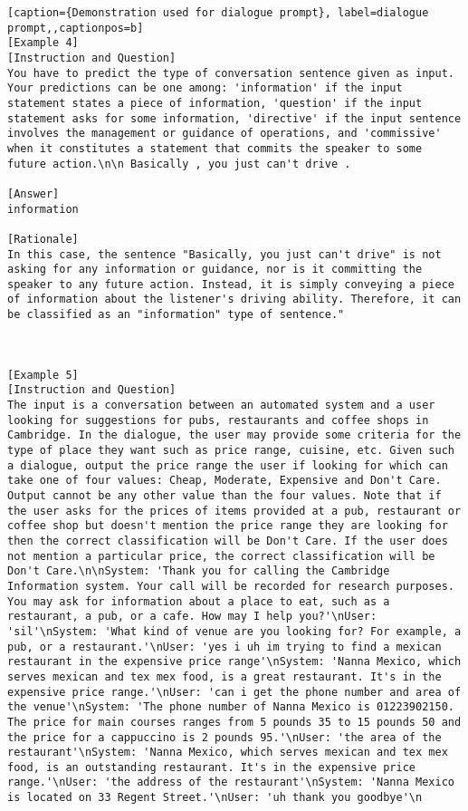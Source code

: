 \begin{lstlisting}[caption={Demonstration used for dialogue prompt}, label=dialogue prompt,,captionpos=b]
[Example 4]
[Instruction and Question]
You have to predict the type of conversation sentence given as input. Your predictions can be one among: 'information' if the input statement states a piece of information, 'question' if the input statement asks for some information, 'directive' if the input sentence involves the management or guidance of operations, and 'commissive' when it constitutes a statement that commits the speaker to some future action.\n\n Basically , you just can't drive . 

[Answer]
information

[Rationale]
In this case, the sentence "Basically, you just can't drive" is not asking for any information or guidance, nor is it committing the speaker to any future action. Instead, it is simply conveying a piece of information about the listener's driving ability. Therefore, it can be classified as an "information" type of sentence."



[Example 5]
[Instruction and Question]
The input is a conversation between an automated system and a user looking for suggestions for pubs, restaurants and coffee shops in Cambridge. In the dialogue, the user may provide some criteria for the type of place they want such as price range, cuisine, etc. Given such a dialogue, output the price range the user if looking for which can take one of four values: Cheap, Moderate, Expensive and Don't Care. Output cannot be any other value than the four values. Note that if the user asks for the prices of items provided at a pub, restaurant or coffee shop but doesn't mention the price range they are looking for then the correct classification will be Don't Care. If the user does not mention a particular price, the correct classification will be Don't Care.\n\nSystem: 'Thank you for calling the Cambridge Information system. Your call will be recorded for research purposes. You may ask for information about a place to eat, such as a restaurant, a pub, or a cafe. How may I help you?'\nUser: 'sil'\nSystem: 'What kind of venue are you looking for? For example, a pub, or a restaurant.'\nUser: 'yes i uh im trying to find a mexican restaurant in the expensive price range'\nSystem: 'Nanna Mexico, which serves mexican and tex mex food, is a great restaurant. It's in the expensive price range.'\nUser: 'can i get the phone number and area of the venue'\nSystem: 'The phone number of Nanna Mexico is 01223902150. The price for main courses ranges from 5 pounds 35 to 15 pounds 50 and the price for a cappuccino is 2 pounds 95.'\nUser: 'the area of the restaurant'\nSystem: 'Nanna Mexico, which serves mexican and tex mex food, is an outstanding restaurant. It's in the expensive price range.'\nUser: 'the address of the restaurant'\nSystem: 'Nanna Mexico is located on 33 Regent Street.'\nUser: 'uh thank you goodbye'\n


\end{lstlisting}
